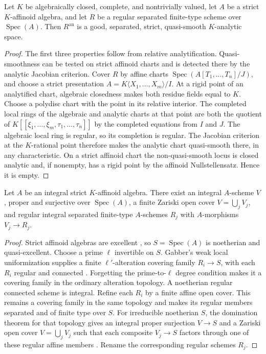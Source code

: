 \documentclass[11pt,a4paper]{amsart}
\begin{document}
\begin{lemma}\label{lem:regular-analytification}
Let $K$ be algebraically closed, complete, and nontrivially valued, let $A$ be a strict $K$-affinoid algebra, and let $R$ be a regular separated finite-type scheme over $\operatorname{Spec}(A)$. Then $R^{\mathrm{an}}$ is a good, separated, strict, quasi-smooth $K$-analytic space.
\end{lemma}

\begin{proof}
The first three properties follow from relative analytification. Quasi-smoothness can be tested on strict affinoid charts and is detected there by the analytic Jacobian criterion. Cover $R$ by affine charts $\operatorname{Spec}(A[T_1,\ldots,T_n]/J)$, and choose a strict presentation $A=K\langle X_1,\ldots,X_m\rangle/I$. At a rigid point of an analytified chart, algebraic closedness makes both residue fields equal to $K$. Choose a polydisc chart with the point in its relative interior. The completed local rings of the algebraic and analytic charts at that point are both the quotient of $K[[\xi_1,\ldots,\xi_m,\tau_1,\ldots,\tau_n]]$ by the completed equations from $I$ and $J$. The algebraic local ring is regular, so its completion is regular. The Jacobian criterion at the $K$-rational point therefore makes the analytic chart quasi-smooth there, in any characteristic. On a strict affinoid chart the non-quasi-smooth locus is closed analytic and, if nonempty, has a rigid point by the affinoid Nullstellensatz. Hence it is empty.
\end{proof}

\begin{lemma}\label{lem:regular-proper-cover}
Let $A$ be an integral strict $K$-affinoid algebra. There exist an integral $A$-scheme $V$, proper and surjective over $\operatorname{Spec}(A)$, a finite Zariski open cover $V=\bigcup_j V_j$, and regular integral separated finite-type $A$-schemes $R_j$ with $A$-morphisms $V_j\to R_j$.
\end{lemma}

\begin{proof}
Strict affinoid algebras are excellent \cite[proof of Theorem~1.3.1]{Berkovich15Finiteness}, so $S=\operatorname{Spec}(A)$ is noetherian and quasi-excellent. Choose a prime $\ell$ invertible on $S$. Gabber's weak local uniformization supplies a finite $\ell'$-alteration covering family $R_i\to S$, with each $R_i$ regular and connected \cite[Expos\'{e}~VII, Th\'{e}or\`{e}me~1.1, with $Z=\varnothing$]{ILO14}. Forgetting the prime-to-$\ell$ degree condition makes it a covering family in the ordinary alteration topology. A noetherian regular connected scheme is integral. Refine each $R_i$ by a finite affine open cover. This remains a covering family in the same topology and makes its regular members separated and of finite type over $S$. For irreducible noetherian $S$, the domination theorem for that topology gives an integral proper surjection $V\to S$ and a Zariski open cover $V=\bigcup_jV_j$ such that each composite $V_j\to S$ factors through one of these regular affine members \cite[Expos\'{e}~II, Th\'{e}or\`{e}me~3.2.1, case $\ell=1$]{ILO14}. Rename the corresponding regular schemes $R_j$.
\end{proof}
\end{document}
